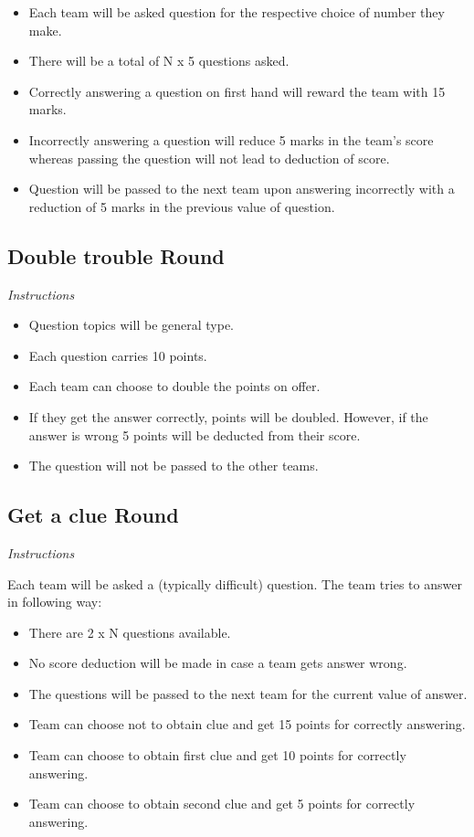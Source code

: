 \documentclass[a4paper,12pt]{exam}
\begin{document}
\begin{itemize}
\item Each team will be asked question for the respective choice of number they make.
\item There will be a total of N x 5 questions asked.
\item Correctly answering a question on first hand will reward the team with 15 marks.
\item Incorrectly answering a question will reduce 5 marks in the team's score whereas passing the question will not lead to deduction of score.
\item Question will be passed to the next team upon answering incorrectly with a reduction of 5 marks in the previous value of question.
\end{itemize}


\subsection*{Double trouble Round}

{\Large \textit{Instructions}}

\begin{itemize}
\item Question topics will be general type. 
\item Each question carries 10 points.
\item Each team can choose to double the points on offer. 
\item If they get the answer correctly, points will be doubled. However, if the answer is wrong 5 points will be deducted from their score.
\item The question will not be passed to the other teams.
\end{itemize}

\subsection*{Get a clue Round}

{\Large \textit{Instructions}}

Each team will be asked a (typically difficult) question. The team tries to answer in following way:

\begin{itemize}
\item There are 2 x N questions available.
\item	No score deduction will be made in case a team gets answer wrong.
\item	The questions will be passed to the next team for the current value of answer.
\item	Team can choose not to obtain clue and get 15 points for correctly answering.
\item	Team can choose to obtain first clue and get 10 points for correctly answering.
\item	Team can choose to obtain second clue and get 5 points for correctly answering.
\end{itemize}
\end{document}
